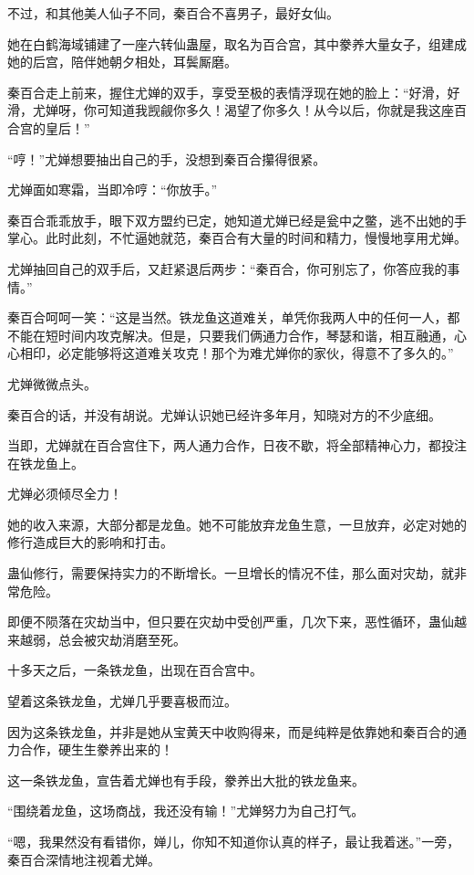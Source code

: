 \begin{this_body}
不过，和其他美人仙子不同，秦百合不喜男子，最好女仙。

她在白鹤海域铺建了一座六转仙蛊屋，取名为百合宫，其中豢养大量女子，组建成她的后宫，陪伴她朝夕相处，耳鬓厮磨。

秦百合走上前来，握住尤婵的双手，享受至极的表情浮现在她的脸上：“好滑，好滑，尤婵呀，你可知道我觊觎你多久！渴望了你多久！从今以后，你就是我这座百合宫的皇后！”

“哼！”尤婵想要抽出自己的手，没想到秦百合攥得很紧。

尤婵面如寒霜，当即冷哼：“你放手。”

秦百合乖乖放手，眼下双方盟约已定，她知道尤婵已经是瓮中之鳖，逃不出她的手掌心。此时此刻，不忙逼她就范，秦百合有大量的时间和精力，慢慢地享用尤婵。

尤婵抽回自己的双手后，又赶紧退后两步：“秦百合，你可别忘了，你答应我的事情。”

秦百合呵呵一笑：“这是当然。铁龙鱼这道难关，单凭你我两人中的任何一人，都不能在短时间内攻克解决。但是，只要我们俩通力合作，琴瑟和谐，相互融通，心心相印，必定能够将这道难关攻克！那个为难尤婵你的家伙，得意不了多久的。”

尤婵微微点头。

秦百合的话，并没有胡说。尤婵认识她已经许多年月，知晓对方的不少底细。

当即，尤婵就在百合宫住下，两人通力合作，日夜不歇，将全部精神心力，都投注在铁龙鱼上。

尤婵必须倾尽全力！

她的收入来源，大部分都是龙鱼。她不可能放弃龙鱼生意，一旦放弃，必定对她的修行造成巨大的影响和打击。

蛊仙修行，需要保持实力的不断增长。一旦增长的情况不佳，那么面对灾劫，就非常危险。

即便不陨落在灾劫当中，但只要在灾劫中受创严重，几次下来，恶性循环，蛊仙越来越弱，总会被灾劫消磨至死。

十多天之后，一条铁龙鱼，出现在百合宫中。

望着这条铁龙鱼，尤婵几乎要喜极而泣。

因为这条铁龙鱼，并非是她从宝黄天中收购得来，而是纯粹是依靠她和秦百合的通力合作，硬生生豢养出来的！

这一条铁龙鱼，宣告着尤婵也有手段，豢养出大批的铁龙鱼来。

“围绕着龙鱼，这场商战，我还没有输！”尤婵努力为自己打气。

“嗯，我果然没有看错你，婵儿，你知不知道你认真的样子，最让我着迷。”一旁，秦百合深情地注视着尤婵。


\end{this_body}
